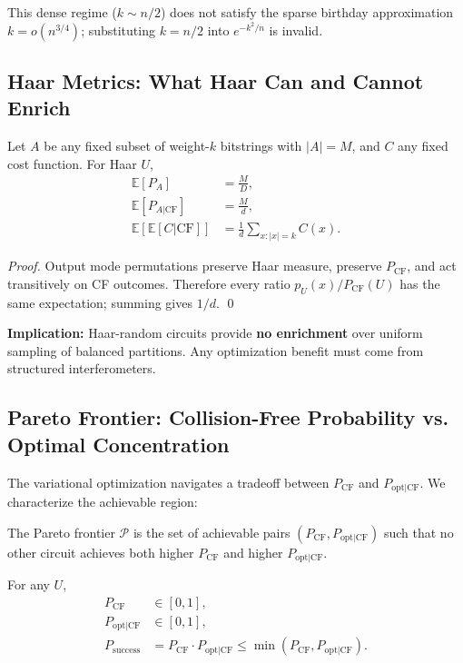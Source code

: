 This dense regime ($k \sim n/2$) does not satisfy the sparse birthday approximation $k = o(n^{3/4})$; substituting $k=n/2$ into $e^{-k^2/n}$ is invalid.

\subsection{Haar Metrics: What Haar Can and Cannot Enrich}

\begin{theorem}
\label{thm:haar_enrichment}
Let $A$ be any fixed subset of weight-$k$ bitstrings with $|A|=M$, and $C$ any fixed cost function. For Haar $U$,
\begin{align}
\mathbb{E}[P_A] &= \frac{M}{D}, \\
\mathbb{E}[P_{A|\mathrm{CF}}] &= \frac{M}{d}, \\
\mathbb{E}[\mathbb{E}[C|\mathrm{CF}]] &= \frac{1}{d}\sum_{x:|x|=k} C(x).
\end{align}
\end{theorem}
\begin{proof}
Output mode permutations preserve Haar measure, preserve $P_{\mathrm{CF}}$, and act transitively on CF outcomes. Therefore every ratio $p_U(x)/P_{\mathrm{CF}}(U)$ has the same expectation; summing gives $1/d$. \qed
\end{proof}

\textbf{Implication:} Haar-random circuits provide \textbf{no enrichment} over uniform sampling of balanced partitions. Any optimization benefit must come from structured interferometers.

\subsection{Pareto Frontier: Collision-Free Probability vs. Optimal Concentration}

The variational optimization navigates a tradeoff between $P_{\mathrm{CF}}$ and $P_{\mathrm{opt|CF}}$. We characterize the achievable region:

\begin{definition}
The Pareto frontier $\mathcal{P}$ is the set of achievable pairs $(P_{\mathrm{CF}}, P_{\mathrm{opt|CF}})$ such that no other circuit achieves both higher $P_{\mathrm{CF}}$ and higher $P_{\mathrm{opt|CF}}$.
\end{definition}

\begin{proposition}
\label{prop:trivial_bounds}
For any $U$,
\begin{align}
P_{\mathrm{CF}} &\in [0,1], \\
P_{\mathrm{opt|CF}} &\in [0,1], \\
P_{\mathrm{success}} &= P_{\mathrm{CF}} \cdot P_{\mathrm{opt|CF}} \le \min(P_{\mathrm{CF}}, P_{\mathrm{opt|CF}}).
\end{align}
\end{proposition}

